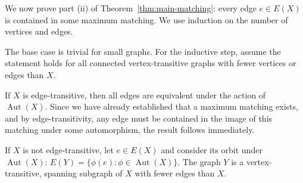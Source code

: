 \documentclass[12pt,a4paper,openany]{book}
\begin{document}
We now prove part (ii) of Theorem~\ref{thm:main-matching}: every edge $e \in E(X)$ is contained in some maximum matching. We use induction on the number of vertices and edges.

The base case is trivial for small graphs. For the inductive step, assume the statement holds for all connected vertex-transitive graphs with fewer vertices or edges than $X$.

If $X$ is edge-transitive, then all edges are equivalent under the action of $\operatorname{Aut}(X)$. Since we have already established that a maximum matching exists, and by edge-transitivity, any edge must be contained in the image of this matching under some automorphism, the result follows immediately.

If $X$ is not edge-transitive, let $e \in E(X)$ and consider its orbit under $\operatorname{Aut}(X)$: $E(Y) = \{ \phi(e) : \phi \in \operatorname{Aut}(X) \}$. The graph $Y$ is a vertex-transitive, spanning subgraph of $X$ with fewer edges than $X$.
\end{document}
